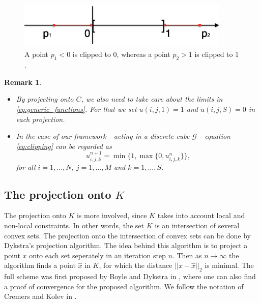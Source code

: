 \documentclass{scrreprt}
\newtheorem{remark}[theorem]{Remark}
\begin{document}
        \begin{figure}[!ht]
            \centering
            \includegraphics[width=0.9\textwidth]{img/projection_onto_c.png}
            \caption[Clipping onto the set $C$.]{\label{fig:projection_onto_c} A point $p_{1} < 0$ is clipped to $0$, whereas a point $p_{2} > 1$ is clipped to $1$.}
        \end{figure}

        \begin{remark}
            \label{rem:clipping}
            \begin{itemize}
                \item By projecting onto $C$, we also need to take care about the limits in \ref{eq:generic_functions}. For that we set $u(i, j, 1) = 1$ and $u(i, j, S) = 0$ in each projection.
                \item In the case of our framework - acting in a discrete cube $\mathcal{G}$ - equation \ref{eq:clipping} can be regarded as
                    $$
                        u^{n+1}_{i,j,k} = \min\{1, \max \{ 0, u^{n}_{i,j,k} \} \},
                    $$
                for all $i = 1, ..., N$, $j = 1, ..., M$ and $k = 1, ..., S$.
            \end{itemize}
        \end{remark}

        \subsection{The projection onto $K$} %
        \label{sub:the_projection_onto_K}

            The projection onto $K$ is more involved, since $K$ takes into account local and non-local constraints. In other words, the set $K$ is an intersection of several convex sets. The projection onto the intersection of convex sets can be done by Dykstra's projection algorithm. The idea behind this algorithm is to project a point $x$ onto each set seperately in an iteration step $n$. Then as $n \to \infty$ the algorithm finds a point $\hat{x}$ in $K$, for which the distance $||x - \hat{x}||_{2}$ is minimal. The full scheme was first proposed by Boyle and Dykstra in \cite{dykstra-et-al-aors14}, where one can also find a proof of convergence for the proposed algorithm. We follow the notation of Cremers and Kolev in \cite{Cremers-Kolev-pami11}.
\end{document}
